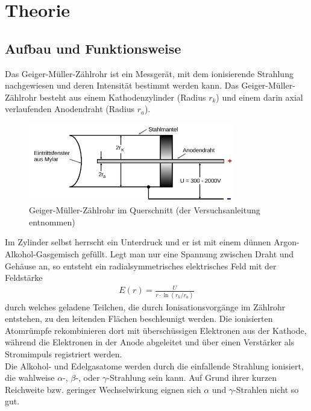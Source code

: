 
\section{Theorie}
\subsection{Aufbau und Funktionsweise}
Das Geiger-Müller-Zählrohr ist ein Messgerät, mit dem ionisierende Strahlung nachgewiesen und deren Intensität bestimmt werden kann. Das Geiger-Müller-Zählrohr besteht aus einem Kathodenzylinder (Radius $r_k$) und einem darin axial verlaufenden Anodendraht (Radius $r_a$).
\begin{figure}[htbp]
\includegraphics[width=0.8\textwidth]{pics/zaehlrohr.jpg}
\caption{Geiger-Müller-Zählrohr im Querschnitt (der Versuchsanleitung entnommen)}
\end{figure}
Im Zylinder selbst herrscht ein Unterdruck und er ist mit einem dünnen Argon-Alkohol-Gasgemisch gefüllt. Legt man nur eine Spannung zwischen Draht und Gehäuse an, so entsteht ein radialsymmetrisches elektrisches Feld mit der Feldstärke
\begin{align}
E(r)= \frac{U}{r\cdot \ln (r_k / r_a)}
\label{eq_efeld}
\end{align}
durch welches geladene Teilchen, die durch Ionisationsvorgänge im Zählrohr entstehen, zu den leitenden Flächen beschleunigt werden. Die ionisierten Atomrümpfe rekombinieren dort mit überschüssigen Elektronen aus der Kathode, während die Elektronen in der Anode abgeleitet und über einen Verstärker als Stromimpuls registriert werden.\\

Die Alkohol- und Edelgasatome werden durch die einfallende Strahlung ionisiert, die wahlweise $\alpha$-, $\beta$-, oder $\gamma$-Strahlung sein kann. Auf Grund ihrer kurzen Reichweite bzw. geringer Wechselwirkung eignen sich $\alpha \text{ und } \gamma$-Strahlen nicht so gut.

